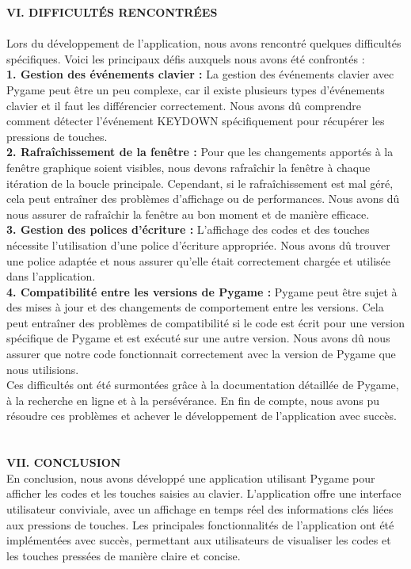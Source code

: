 \documentclass[a4paper, 12px]{article}
\begin{document}
{\bfseries \MakeUppercase{VI. Difficultés rencontrées}}\\
\\
Lors du développement de l'application, nous avons rencontré quelques difficultés spécifiques. Voici les principaux défis auxquels nous avons été confrontés :\\
{\bfseries 1.	Gestion des événements clavier :} La gestion des événements clavier avec Pygame peut être un peu complexe, car il existe plusieurs types d'événements clavier et il faut les différencier correctement. Nous avons dû comprendre comment détecter l'événement KEYDOWN spécifiquement pour récupérer les pressions de touches.\\
{\bfseries 2.	Rafraîchissement de la fenêtre :} Pour que les changements apportés à la fenêtre graphique soient visibles, nous devons rafraîchir la fenêtre à chaque itération de la boucle principale. Cependant, si le rafraîchissement est mal géré, cela peut entraîner des problèmes d'affichage ou de performances. Nous avons dû nous assurer de rafraîchir la fenêtre au bon moment et de manière efficace.\\
{\bfseries 3.	Gestion des polices d'écriture :} L'affichage des codes et des touches nécessite l'utilisation d'une police d'écriture appropriée. Nous avons dû trouver une police adaptée et nous assurer qu'elle était correctement chargée et utilisée dans l'application.\\
{\bfseries 4.	Compatibilité entre les versions de Pygame :} Pygame peut être sujet à des mises à jour et des changements de comportement entre les versions. Cela peut entraîner des problèmes de compatibilité si le code est écrit pour une version spécifique de Pygame et est exécuté sur une autre version. Nous avons dû nous assurer que notre code fonctionnait correctement avec la version de Pygame que nous utilisions.\\
Ces difficultés ont été surmontées grâce à la documentation détaillée de Pygame, à la recherche en ligne et à la persévérance. En fin de compte, nous avons pu résoudre ces problèmes et achever le développement de l'application avec succès.
\\
\\
\\
{\bfseries \MakeUppercase{VII. Conclusion}}\\
En conclusion, nous avons développé une application utilisant Pygame pour afficher les codes et les touches saisies au clavier. L'application offre une interface utilisateur conviviale, avec un affichage en temps réel des informations clés liées aux pressions de touches. Les principales fonctionnalités de l'application ont été implémentées avec succès, permettant aux utilisateurs de visualiser les codes et les touches pressées de manière claire et concise.
\end{document}
